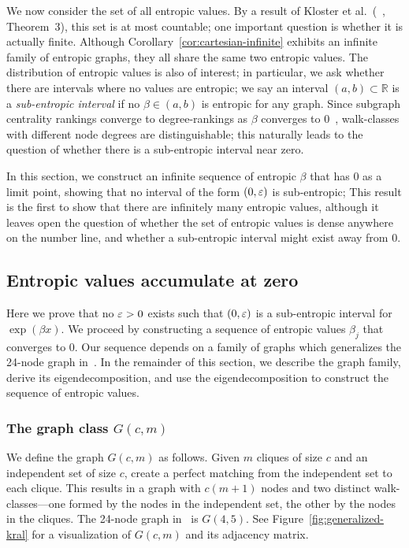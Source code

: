 
We now consider the set of all entropic values.
By a result of Kloster et al.~(~\cite{Kloster2018115}, Theorem~3), this set is at most countable; one important question is whether it is actually finite.
Although Corollary~\ref{cor:cartesian-infinite} exhibits an infinite family of entropic graphs, they all share the same two entropic values. The distribution of entropic values is also of interest; in particular, we ask whether there are intervals where no values are entropic; we say an interval $(a,b) \subset \mathbb{R}$ is a \emph{sub-entropic interval} if no $\beta \in (a,b)$ is entropic for any graph.
Since subgraph centrality rankings converge to degree-rankings as $\beta$ converges to 0~\cite{benzi2015limiting}, walk-classes with different node degrees are distinguishable;
this naturally leads to the question of whether there is a sub-entropic interval near zero.

In this section, we construct an infinite sequence of entropic $\beta$ that has 0 as a limit point,
showing that no interval of the form $(0, \varepsilon)$ is sub-entropic;
This result is the first to show that there are infinitely many entropic values, although it leaves open the question of whether the set of entropic values is dense anywhere on the number line, and whether a sub-entropic interval might exist away from 0.

\subsection{Entropic values accumulate at zero}\label{sec:infinite-betas}
Here we prove that no $\varepsilon > 0$ exists such that $(0,\varepsilon)$ is a sub-entropic interval for $\exp(\beta x)$.
We proceed by constructing a sequence of entropic values $\beta_j$ that converges to 0.
Our sequence depends on a family of graphs which generalizes the 24-node graph in~\cite{Kloster2018115}.
In the remainder of this section, we describe the graph family, derive its eigendecomposition, and use the eigendecomposition to construct the sequence of entropic values.

\subsubsection*{The graph class $G(c,m)$}
We define the graph $G(c,m)$ as follows. Given $m$ cliques of size $c$ and an independent set of size $c$, create a perfect matching from the independent set to each clique.
This results in a graph with $c(m+1)$ nodes and two distinct walk-classes---one formed by the nodes in the independent set, the other by the nodes in the cliques.
The 24-node graph in~\cite{Kloster2018115} is $G(4,5)$.
See Figure~\ref{fig:generalized-kral} for a visualization of $G(c,m)$ and its adjacency matrix.


